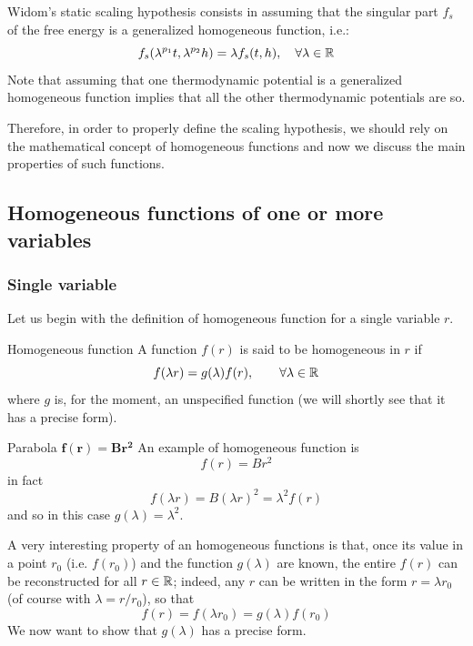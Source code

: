 \documentclass[../../Main/Main.tex]{subfiles}
\begin{document}
Widom's static scaling hypothesis consists in assuming that the singular part \( f_s \) of the free energy is a generalized homogeneous function, i.e.:
\begin{equation*}
  f_s (\lambda ^{p_1}t, \lambda ^{p_2} h) = \lambda f _s (t,h), \quad \forall \lambda \in \mathbb{R}
\end{equation*}
Note that assuming that one thermodynamic potential is a generalized homogeneous function implies that all the other thermodynamic potentials are so.

Therefore, in order to properly define the scaling hypothesis, we should rely on the mathematical concept of homogeneous functions and now we discuss the main properties of such functions.



\subsection{Homogeneous functions of one or more variables}

\subsubsection{Single variable}
Let us begin with the definition of homogeneous function for a single variable \( r \).
\begin{definition}{Homogeneous function}{}
A function \( f(r) \) is said to be homogeneous in \( r \) if
\begin{equation}
  f (\lambda r) = g (\lambda ) f(r), \qquad \forall \lambda \in \mathbb{R}
\end{equation}
where \( g \) is, for the moment, an unspecified function (we will shortly see that it has a precise form).
\end{definition}
\begin{example}{Parabola \( \pmb{ f(r) = B r^2} \) }{}
  An example of homogeneous function is
\begin{equation*}
  f(r) = B r^2
\end{equation*}
in fact
\begin{equation*}
  f ( \lambda r) = B ( \lambda r)^2 = \lambda ^2 f (r)
\end{equation*}
and so in this case \( g ( \lambda ) = \lambda ^2 \).
\end{example}

A very interesting property of an homogeneous functions is that,  once its value in a point \( r_0 \) (i.e. \( f(r_0) \)) and the function \( g(\lambda ) \) are known,
the entire \( f(r) \) can be reconstructed for all \( r \in \mathbb{R} \); indeed, any \( r \) can be written in the form \( r=\lambda r_0 \) (of course with \( \lambda = r / r_0 \)), so that
\begin{equation}
  f(r) = f (\lambda r_0) = g(\lambda ) f(r_0)
\end{equation}
We now want to show that \( g (\lambda ) \)  has a precise form.
\end{document}
